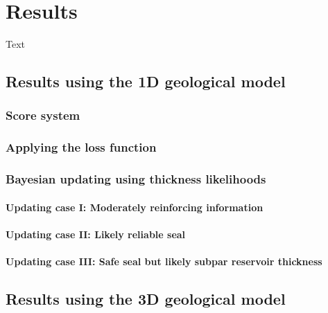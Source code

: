 	\chapter{Results}\label{cha:results}
	Text
	
		\section{Results using the 1D geological model}
		
			\subsection{Score system}
			
			\subsection{Applying the loss function}
			
			\subsection{Bayesian updating using thickness likelihoods}
			
				\subsubsection{Updating case I: Moderately reinforcing information}
				
				\subsubsection{Updating case II: Likely reliable seal}
				
				\subsubsection{Updating case III: Safe seal but likely subpar reservoir thickness}
	
		\section{Results using the 3D geological model}